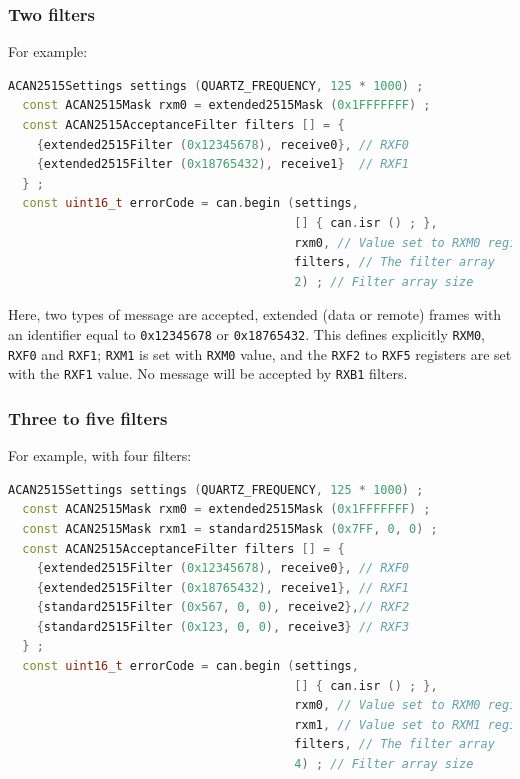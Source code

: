 \documentclass[9pt, a4paper, obeyspaces]{extarticle}
\newcommand \subsubsectionLabel[2]{\subsubsection{#1}\label{subsubsec:#2}}
\begin{document}
\subsubsectionLabel{Two filters}{twoFilters}

For example:
{ \small\begin{lstlisting}[language=c++]
  ACAN2515Settings settings (QUARTZ_FREQUENCY, 125 * 1000) ;
  const ACAN2515Mask rxm0 = extended2515Mask (0x1FFFFFFF) ;
  const ACAN2515AcceptanceFilter filters [] = {
    {extended2515Filter (0x12345678), receive0}, // RXF0
    {extended2515Filter (0x18765432), receive1}  // RXF1
  } ;
  const uint16_t errorCode = can.begin (settings,
                                        [] { can.isr () ; },
                                        rxm0, // Value set to RXM0 register
                                        filters, // The filter array
                                        2) ; // Filter array size
\end{lstlisting}}

Here, two types of message are accepted, extended (data or remote) frames with an identifier equal to \texttt{0x12345678} or \texttt{0x18765432}. This defines explicitly \texttt{RXM0}, \texttt{RXF0} and \texttt{RXF1}; \texttt{RXM1} is set with \texttt{RXM0} value, and the \texttt{RXF2} to \texttt{RXF5} registers are set with the \texttt{RXF1} value. No message will be accepted by \texttt{RXB1} filters.










\subsubsectionLabel{Three to five filters}{threeToFiveFilters}

For example, with four filters:
{ \small\begin{lstlisting}[language=c++]
  ACAN2515Settings settings (QUARTZ_FREQUENCY, 125 * 1000) ;
  const ACAN2515Mask rxm0 = extended2515Mask (0x1FFFFFFF) ;
  const ACAN2515Mask rxm1 = standard2515Mask (0x7FF, 0, 0) ;
  const ACAN2515AcceptanceFilter filters [] = {
    {extended2515Filter (0x12345678), receive0}, // RXF0
    {extended2515Filter (0x18765432), receive1}, // RXF1
    {standard2515Filter (0x567, 0, 0), receive2},// RXF2
    {standard2515Filter (0x123, 0, 0), receive3} // RXF3
  } ;
  const uint16_t errorCode = can.begin (settings,
                                        [] { can.isr () ; },
                                        rxm0, // Value set to RXM0 register
                                        rxm1, // Value set to RXM1 register
                                        filters, // The filter array
                                        4) ; // Filter array size
\end{lstlisting}}
\end{document}
